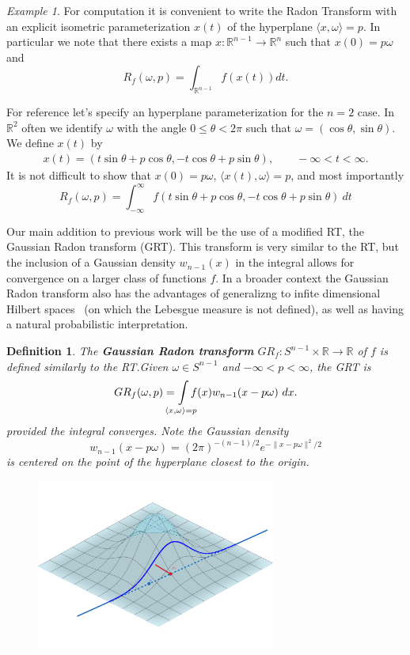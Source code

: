 \documentclass{amsart}
\newtheorem{definition}[theorem]{Definition}
\theoremstyle{remark}
\newtheorem{example}[theorem]{Example}
\numberwithin{equation}{section}
\newcommand{\RR}{\mathbb{R}}
\def\mclimits_#1{\limits_{\mathclap{#1}}}
\begin{document}
\begin{example}
For computation it is convenient to write the Radon Transform with an explicit isometric parameterization $x(t)$ of the hyperplane $\langle x, \omega\rangle = p$. In particular we note that there exists a map $x : \RR^{n-1} \longrightarrow \RR^n$ such that $x(0) = p\omega$ and
\[
    R_f(\omega, p) = \int_{\RR^{n-1}} f(x(t)) dt.
\]

For reference let's specify an hyperplane parameterization for the $n=2$ case. In $\RR^2$ often we identify $\omega$ with the angle $0 \leq \theta < 2\pi$ such that $\omega = (\cos \theta, \sin \theta)$. We define $x(t)$ by
\begin{align*}
    x(t) = (t \sin \theta + p \cos \theta, -t \cos \theta + p \sin \theta), \qquad -\infty < t < \infty.
\end{align*}
It is not difficult to show that $x(0) = p\omega$, $\langle x(t), \omega \rangle = p$, and most importantly
\[
    R_f(\omega, p) = \int_{-\infty}^\infty f(t \sin \theta + p \cos \theta, -t \cos \theta + p \sin \theta)~dt
\]
\end{example}

Our main addition to previous work will be the use of a modified RT, the Gaussian Radon transform (GRT). This transform is very similar to the RT, but the inclusion of a Gaussian density $w_{n-1}(x)$ in the integral allows for convergence on a larger class of functions $f$. In a broader context the Gaussian Radon transform also has the advantages of generalizng to infite dimensional Hilbert spaces~\cite{Seng14} (on which the Lebesgue measure is not defined), as well as having a natural probabilistic interpretation.


\begin{definition}
The \textbf{Gaussian Radon transform} $GR_f : S^{n-1} \times \RR \rightarrow \RR$ of $f$ is defined similarly to the RT.\@ Given $\omega \in S^{n-1}$ and $-\infty < p < \infty$, the GRT is
\[
    GR_f(\omega, p) = 
    \int\mclimits_{\langle x, \omega \rangle = p} f(x) w_{n-1}(x - p\omega) ~dx.
\]
provided the integral converges. Note the Gaussian density 
\[
    w_{n-1}(x - p\omega) = {(2\pi)}^{-(n-1)/2}e^{-\|x - p\omega\|^2/2}
\] 
is centered on the point of the hyperplane closest to the origin.
\end{definition}

\begin{figure}[h]
\includegraphics[width=0.7\textwidth]{geogebra-export.png}
\end{figure}
\end{document}
